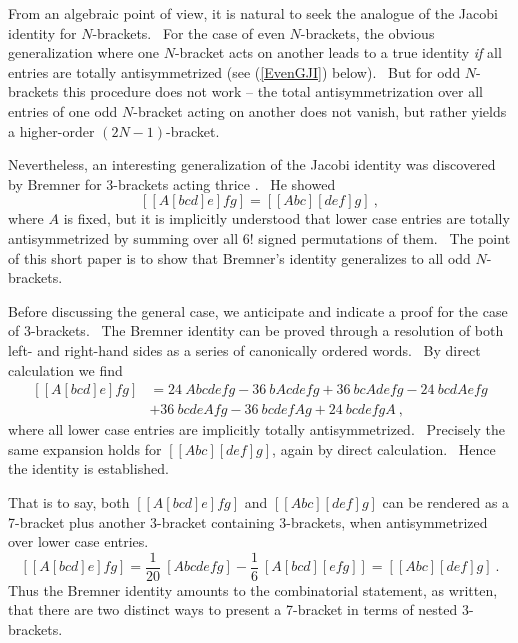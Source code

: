 \documentclass[aps,preprint,tightenlines,unsortedaddress,11pt]{revtex4}\usepackage{amsfonts}
\begin{document}
From an algebraic point of view, it is natural to seek the analogue of the
Jacobi identity for $N$-brackets. \ For the case of even $N$-brackets, the
obvious generalization where one $N$-bracket acts on another leads to a true
identity \emph{if} all entries are totally antisymmetrized (see (\ref{EvenGJI}) below). \ But for odd $N$-brackets this procedure does not work
\cite{Bremner,deAzcarraga} -- the total antisymmetrization over all entries of
one odd $N$-bracket acting on another does not vanish, but rather yields a
higher-order $\left(  2N-1\right)  $-bracket. \ 

Nevertheless, an interesting generalization of the Jacobi identity was
discovered by Bremner for $3$-brackets acting thrice \cite{Bremner}. \ He
showed
\begin{equation}
\left[  \left[  A\left[  bcd\right]  e\right]  fg\right]  =\left[  \left[
Abc\right]  \left[  def\right]  g\right]  \ , \label{B}\end{equation}
where $A$ is fixed, but it is implicitly understood that lower case entries
are totally antisymmetrized by summing over all $6!$ signed permutations of
them. \ The point of this short paper is to show that Bremner's identity
generalizes to all odd $N$-brackets. \ 

Before discussing the general case, we anticipate and indicate a proof for the
case of $3$-brackets. \ The Bremner identity can be proved through a
resolution of both left- and right-hand sides as a series of canonically
ordered words. \ By direct calculation we find\begin{align}
\left[  \left[  A\left[  bcd\right]  e\right]  fg\right]   &
=24~Abcdefg-36~bAcdefg+36~bcAdefg-24~bcdAefg\nonumber\\
&  +36~bcdeAfg-36~bcdefAg+24~bcdefgA\ ,
\end{align}
where all lower case entries are implicitly totally antisymmetrized.
\ Precisely the same expansion holds for $\left[  \left[  Abc\right]  \left[
def\right]  g\right]  $, again by direct calculation. \ Hence the identity is
established. \ 

That is to say, both $\left[  \left[  A\left[  bcd\right]  e\right]
fg\right]  $ and $\left[  \left[  Abc\right]  \left[  def\right]  g\right]  $
can be rendered as a 7-bracket plus another 3-bracket containing 3-brackets,
when antisymmetrized over lower case entries.\begin{equation}
\left[  \left[  A\left[  bcd\right]  e\right]  fg\right]  =\frac{1}{20}~\left[  Abcdefg\right]  -\frac{1}{6}~\left[  A\left[  bcd\right]  \left[
efg\right]  \right]  =\left[  \left[  Abc\right]  \left[  def\right]
g\right]  \ .
\end{equation}
Thus the Bremner identity amounts to the combinatorial statement, as written,
that there are two distinct ways to present a 7-bracket in terms of nested 3-brackets.
\end{document}
